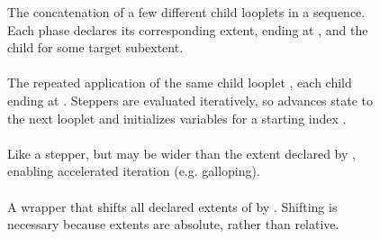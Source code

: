 \begin{figure}
  The concatenation of a few different child looplets in a sequence. Each phase
  declares its corresponding extent, ending at , and the
  child  for some target subextent.



  \paragraph{}

  The repeated application of the same child looplet ,
  each child ending at . Steppers are evaluated iteratively,
  so  advances state to the next looplet and
   initializes variables for a starting index
  .


  \paragraph{}

  Like a stepper, but  may be wider than the extent declared by
  , enabling accelerated iteration (e.g. galloping).



\vspace{10pt}

\begin{minipage}{0.5\linewidth}
  \paragraph{}

  A wrapper that shifts all declared extents of  by
  .  Shifting is necessary because extents are
  absolute, rather than relative.
\end{minipage}\hspace{8pt}%
\begin{minipage}{0.5\linewidth - 8pt}

\end{minipage}

\begin{minipage}{0.55\linewidth}
  \paragraph{}


\end{minipage}
\end{figure}
